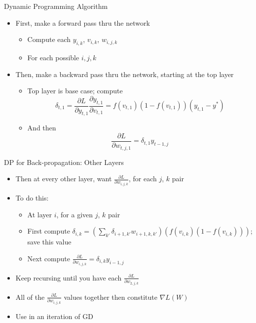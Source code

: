 \documentclass[aspectratio=169]{beamer}
\begin{document}
\begin{frame}{Dynamic Programming Algorithm}
\begin{itemize}
	\item First, make a forward pass thru the network
	\begin{itemize}
	\item Compute each $y_{i,k}$, $v_{i,k}$, $w_{i,j,k}$
	\item For each possible $i, j, k$
	\end{itemize}
	\item Then, make a backward pass thru the network, starting at the top layer
	\begin{itemize}
	\item Top layer is base case; compute $$\delta_{t,1} = \frac{\partial L}{\partial y_{t,1}}
                                                \frac{\partial y_{t,1}}{\partial v_{t,1}} =
			 f(v_{t,1})(1 - f(v_{t,1})) (y_{t,1} - y^{*})$$
	\item And then $$\frac{\partial L}{\partial w_{t,j,1}} = \delta_{t,1}
		 y_{t-1,j}$$
	\end{itemize}
\end{itemize}
\end{frame}
\begin{frame}{DP for Back-propagation: Other Layers}
\begin{itemize}
	\item Then at every other layer, want $\frac{\partial L}{\partial w_{i,j,k}}$, for each $j$, $k$ pair
	\item To do this:
	\begin{itemize}
	\item At layer $i$, for a given $j$, $k$ pair
	\item First compute $\delta_{i,k} =  \left( \sum_{k'} \delta_{i+1,k'} w_{i+1,k,k'} \right)
                \left( f(v_{i,k})(1 - f(v_{i,k})) \right)$; save this value
	\item Next compute $\frac{\partial L}{\partial w_{i,j,k}} = \delta_{i,k} y_{i-1,j}$
	\end{itemize}
	\item Keep recursing until you have each $\frac{\partial L}{\partial w_{2,j,k}}$
	\item All of the $\frac{\partial L}{\partial w_{i,j,k}}$ values together then constitute $\nabla L(W)$
	\item Use in an iteration of GD
\end{itemize}
\end{frame}
\end{document}
